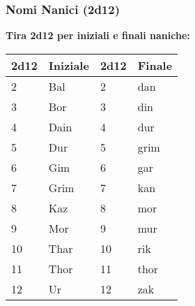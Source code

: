 \begin{multicols}{2}
{\subsubsection*{Nomi Nanici (2d12)}
\textbf{Tira 2d12 per iniziali e finali naniche:}

\noindent\begin{tabularx}{\linewidth}{X|l|X|l}
	\toprule
\rowcolor{gray!20}\textbf{2d12} & \textbf{Iniziale} & \textbf{2d12} & \textbf{Finale} \\
\toprule
2 & Bal & 2 & dan \\
\rowcolor{gray!20}3 & Bor & 3 & din \\
4 & Dain & 4 & dur \\
\rowcolor{gray!20}5 & Dur & 5 & grim \\
6 & Gim & 6 & gar \\
\rowcolor{gray!20}7 & Grim & 7 & kan \\
8 & Kaz & 8 & mor \\
\rowcolor{gray!20}9 & Mor & 9 & mur \\
10 & Thar & 10 & rik \\
\rowcolor{gray!20}11 & Thor & 11 & thor \\
12 & Ur & 12 & zak \\
\end{tabularx}



%
%

}
\end{multicols}
